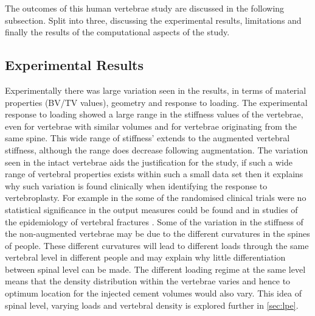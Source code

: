 The outcomes of this human vertebrae study are discussed in the following
subsection. Split into three, discussing the experimental results, limitations
and finally the results of the computational aspects of the study.

\subsection{Experimental Results} \label{sec:exp_disc}

Experimentally there was large variation seen in the results, in terms of
material properties (BV/TV values), geometry and response to loading.  The
experimental response to loading showed a large range in the stiffness values
of the vertebrae, even for vertebrae with similar volumes and for vertebrae
originating from the same spine.  This wide range of stiffness' extends to the
augmented vertebral stiffness, although the range does decrease following
augmentation.  The variation seen in the intact vertebrae aids the
justification for the study, if such a wide range of vertebral properties
exists within such a small data set then it explains why such variation is
found clinically when identifying the response to vertebroplasty. For example
in the some of the randomised clinical trials were no statistical significance
in the output measures could be found and in studies of the epidemiology of vertebral fractures
\cite{Buchbinder2009a,Kallmes2009,MeltonIII2006}.
Some of the variation in the stiffness of the non-augmented
vertebrae may be due to the different curvatures in the spines of people. These
different curvatures will lead to different loads through the same vertebral
level in different people and may explain why little differentiation between
spinal level can be made. The different loading regime at the same level means
that the density distribution within the vertebrae varies and hence to optimum
location for the injected cement volumes would also vary. This idea of spinal
level, varying loads and vertebral density is explored further in
\cref{sec:lpe}.

